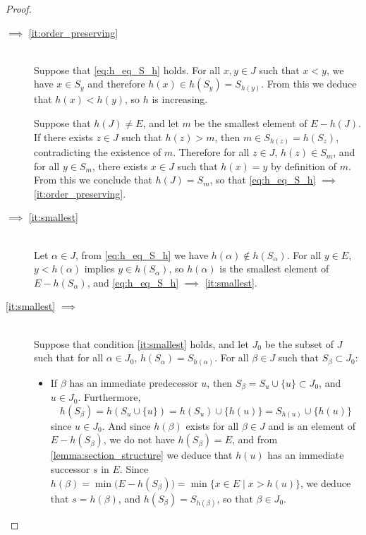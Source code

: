 \documentclass[11pt,a4paper,twoside]{article}
\makeatletter
\theoremstyle{definition}
\def\btagform@#1{\maketag@@@{\textbf{(\ignorespaces#1\unskip\@@italiccorr)}}}
\newcommand{\beqref}[1]{\textup{\btagform@{\ref{#1}}}}
\makeatother
\begin{document}
\begin{proof}
\begin{enumerate}[(a)]
\begin{description}
    \item [\beqref{eq:h_eq_S_h} $\bm{\implies}$ \ref{it:order_preserving}]~\\
      Suppose that \eqref{eq:h_eq_S_h} holds. For all $x, y \in J$ such that $x < y$, we have $x \in S_y$ and therefore
      $h ( x ) \in h ( S_y ) = S_{ h ( y ) }$. From this we deduce that $h ( x ) < h ( y )$, so $h$ is increasing.

      Suppose that $h ( J ) \neq E$, and let $m$ be the smallest element of $E - h ( J )$. If there exists $z \in J$ such that
      $h ( z ) > m$, then $m \in S_{ h ( z ) } = h ( S_z )$, contradicting the existence of $m$. Therefore for all $z \in J$,
      $h ( z ) \in S_m$, and for all $y \in S_m$, there exists $x \in J$ such that $h ( x ) = y$ by definition of $m$.
      From this we conclude that $h ( J ) = S_m$, so that \eqref{eq:h_eq_S_h} $\implies$ \ref{it:order_preserving}.

    \item [\beqref{eq:h_eq_S_h} $\bm{\implies}$ \ref{it:smallest}]~\\
      Let $\alpha \in J$, from \eqref{eq:h_eq_S_h} we have $h ( \alpha ) \notin h ( S_\alpha )$. For all $y \in E$,
      $y < h ( \alpha )$ implies $y \in h ( S_\alpha )$, so $h ( \alpha )$ is the smallest element of $E - h ( S_\alpha )$,
      and \eqref{eq:h_eq_S_h} $\implies$ \ref{it:smallest}.

    \item [\ref{it:smallest} $\bm{\implies}$ \beqref{eq:h_eq_S_h}]~\\
      Suppose that condition \ref{it:smallest} holds, and let $J_0$ be the subset of $J$ such that for all $\alpha \in J_0$,
      $h ( S_\alpha ) = S_{ h ( \alpha ) }$. For all $\beta \in J$ such that $S_\beta \subset J_0$:
      \begin{itemize}

      \item If $\beta$ has an immediate predecessor $u$, then $S_\beta = S_u \cup \{ u \} \subset J_0$, and $u \in J_0$.
        Furthermore,
        \begin{equation*}
          h ( S_\beta ) = h ( S_u \cup \{ u \} ) = h ( S_u ) \cup \{ h ( u ) \} = S_{ h ( u ) } \cup \{ h ( u ) \}
        \end{equation*}
        since $u \in J_0$. And since $h ( \beta )$ exists for all $\beta \in J$ and is an element of $E - h ( S_\beta )$,
        we do not have $h ( S_\beta ) = E$, and from \cref{lemma:section_structure} we deduce that $h ( u )$ has
        an immediate successor $s$ in $E$. Since $h ( \beta ) = \min \big( E - h ( S_\beta ) \big) = \min \{ x \in E \mid x > h ( u ) \}$,
        we deduce that $s = h ( \beta )$, and $h ( S_\beta ) = S_{ h ( \beta ) }$, so that $\beta \in J_0$.


\end{itemize}
\end{description}
\end{enumerate}
\end{proof}
\end{document}

